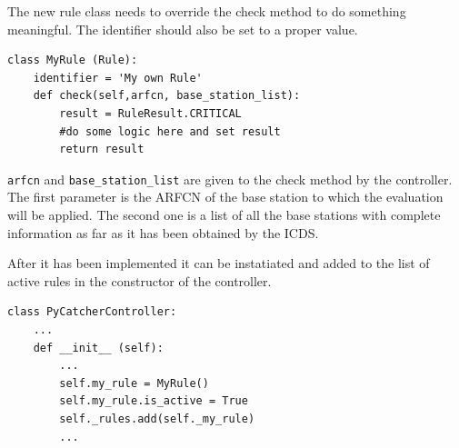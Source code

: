 The new rule class needs to override the check method to do something meaningful.
The identifier should also be set to a proper value.
\begin{lstlisting}
class MyRule (Rule):
    identifier = 'My own Rule'
    def check(self,arfcn, base_station_list):
        result = RuleResult.CRITICAL
        #do some logic here and set result 
        return result
\end{lstlisting}
\texttt{arfcn} and \texttt{base\_station\_list} are given to the check method by the controller.
The first parameter is the ARFCN of the base station to which the evaluation will be applied.
The second one is a list of all the base stations with complete information as far as it has been
obtained by the ICDS.

After it has been implemented it can be instatiated and added to the list of active rules in the 
constructor of the controller.
\begin{lstlisting}
class PyCatcherController:
    ...
    def __init__ (self):
        ...
        self.my_rule = MyRule()
        self.my_rule.is_active = True
        self._rules.add(self._my_rule)
        ...
\end{lstlisting}
